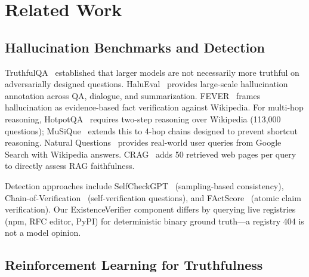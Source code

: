 \documentclass[11pt]{article}
\begin{document}
\section{Related Work}
\label{sec:related}

\subsection{Hallucination Benchmarks and Detection}

TruthfulQA~\cite{lin2022truthfulqa} established that larger models are not necessarily more truthful on adversarially designed questions. HaluEval~\cite{li2023halueval} provides large-scale hallucination annotation across QA, dialogue, and summarization. FEVER~\cite{thorne2018fever} frames hallucination as evidence-based fact verification against Wikipedia. For multi-hop reasoning, HotpotQA~\cite{yang2018hotpotqa} requires two-step reasoning over Wikipedia (113{,}000 questions); MuSiQue~\cite{trivedi2022musique} extends this to 4-hop chains designed to prevent shortcut reasoning. Natural Questions~\cite{kwiatkowski2019natural} provides real-world user queries from Google Search with Wikipedia answers. CRAG~\cite{crag2024} adds 50 retrieved web pages per query to directly assess RAG faithfulness.

Detection approaches include SelfCheckGPT~\cite{manakul2023selfcheckgpt} (sampling-based consistency), Chain-of-Verification~\cite{dhuliawala2024cove} (self-verification questions), and FActScore~\cite{min2023factscore} (atomic claim verification). Our ExistenceVerifier component differs by querying live registries (npm, RFC editor, PyPI) for deterministic binary ground truth---a registry 404 is not a model opinion.

\subsection{Reinforcement Learning for Truthfulness}
\end{document}
